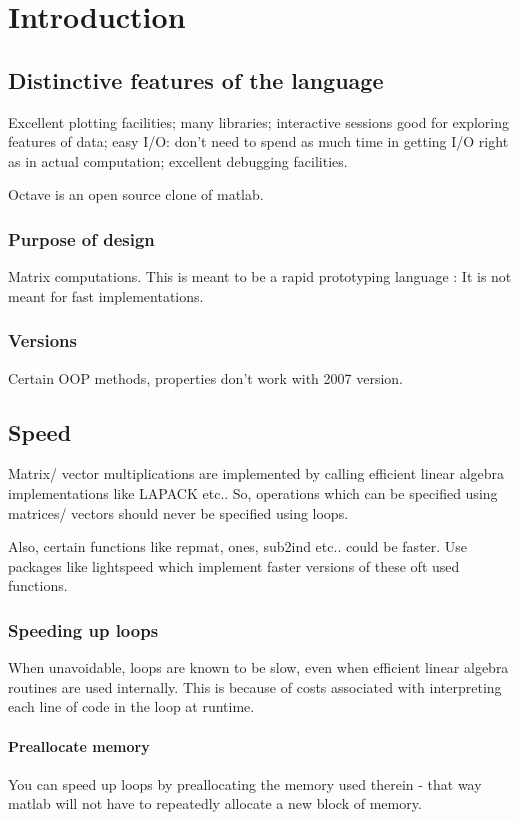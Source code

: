\section{Introduction}
\subsection{Distinctive features of the language}
Excellent plotting facilities; many libraries; interactive sessions good for exploring features of data; easy I/O: don't need to spend as much time in getting I/O right as in actual computation; excellent debugging facilities.

Octave is an open source clone of matlab.

\subsubsection{Purpose of design}
Matrix computations. This is meant to be a rapid prototyping language : It is not meant for fast implementations.

\subsubsection{Versions}
Certain OOP methods, properties don't work with 2007 version.

\subsection{Speed}
Matrix/ vector multiplications are implemented by calling efficient linear algebra implementations like LAPACK etc.. So, operations which can be specified using matrices/ vectors should never be specified using loops.

Also, certain functions like repmat, ones, sub2ind etc.. could be faster. Use packages like lightspeed which implement faster versions of these oft used functions.

\subsubsection{Speeding up loops}
When unavoidable, loops are known to be slow, even when efficient linear algebra routines are used internally. This is because of costs associated with interpreting each line of code in the loop at runtime.

\paragraph{Preallocate memory}
You can speed up loops by preallocating the memory used therein - that way matlab will not have to repeatedly allocate a new block of memory.

